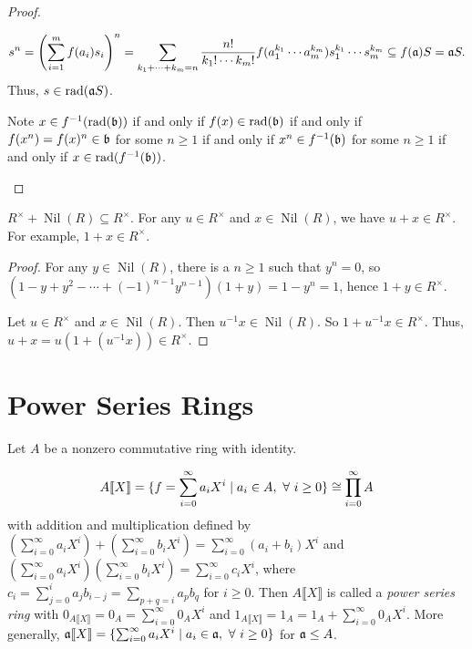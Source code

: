 \begin{proof}
\begin{enumerate}
            \[s^n = \left(\sum_{i=1}^m f(a_i)s_i\right)^n = \sum_{k_1 + \cdots + k_m = n} \frac{n!}{k_1! \cdots k_m!} f(a_1^{k_1} \cdots a_m^{k_m}) s_1^{k_1} \cdots s_m^{k_m} \subseteq f(\mathfrak{a})S = \mathfrak{a} S.\]
            Thus, $s \in \operatorname{rad}(\mathfrak{a} S)$. \par
            Note $x \in f^{-1}(\operatorname{rad}(\mathfrak{b}))$ if and only if $f(x) \in \operatorname{rad}(\mathfrak{b})$ if and only if $f(x^n) = f(x)^n \in \mathfrak{b}$ for some $n \geq 1$ if and only if $x^n  \in f^{-1}(\mathfrak{b})$ for some $n \geq 1$ if and only if $x \in \operatorname{rad}(f^{-1}(\mathfrak{b}))$. \qedhere
    \end{enumerate}
\end{proof}

\begin{proposition}
    $R^\times + \operatorname{Nil}(R) \subseteq R^\times$. For any $u \in R^\times$ and $x \in \operatorname{Nil}(R)$, we have $u+x \in R^\times$. For example, $1+x \in R^\times$.
\end{proposition}

\begin{proof}
    For any $y \in \operatorname{Nil}(R)$, there is a $n \geq 1$ such that $y^n = 0$, so $(1-y+y^2-\cdots+(-1)^{n-1}y^{n-1})(1+y) = 1-y^n = 1$, hence $1+y \in R^\times$. \par 
    Let $u \in R^\times$ and $x \in \operatorname{Nil}(R)$. Then $u^{-1}x \in \operatorname{Nil}(R)$. So $1+u^{-1}x \in R^\times$. Thus, $u + x = u(1+(u^{-1}x)) \in R^\times$. 
\end{proof}

\section*{Power Series Rings}

Let $A$ be a nonzero commutative ring with identity.

\begin{definition}
    \[A \llbracket X \rrbracket = \{f = \sum_{i=0}^\infty a_iX^i \mid a_i \in A, \ \forall \  i \geq 0\} \cong \prod_{i=0}^\infty A\] 
    with addition and multiplication defined by $(\sum_{i=0}^\infty a_iX^i) + (\sum_{i=0}^\infty b_iX^i) = \sum_{i=0}^\infty (a_i+b_i)X^i$ and $(\sum_{i=0}^\infty a_iX^i)(\sum_{i=0}^\infty b_iX^i) = \sum_{i=0}^\infty c_iX^i$, where $c_i = \sum_{j=0}^i a_jb_{i-j} = \sum_{p+q = i}a_pb_q$ for $i \geq 0$. Then $A\llbracket X \rrbracket$ is called a \emph{power series ring} with $0_{A\llbracket X \rrbracket} = 0_A = \sum_{i=0}^\infty 0_AX^i$ and $1_{A\llbracket X \rrbracket} = 1_A = 1_A + \sum_{i=0}^\infty 0_A X^i$. More generally, $\mathfrak{a}\llbracket X \rrbracket = \{\sum_{i=0}^\infty a_iX^i \mid a_i \in \mathfrak{a}, \ \forall \  i \geq 0\}$ for $\mathfrak{a} \leq A$.
\end{definition}

